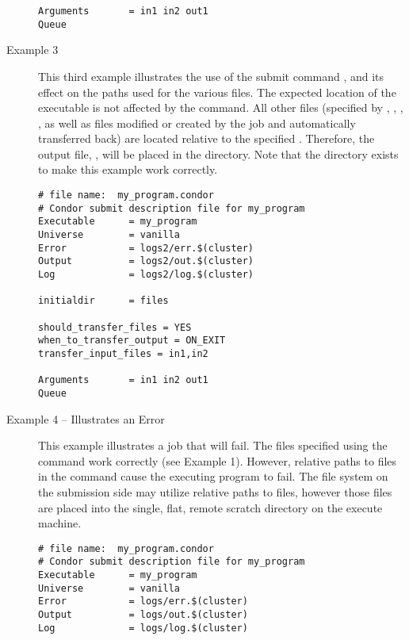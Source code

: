 \begin{description}
\begin{verbatim}
Arguments       = in1 in2 out1
Queue
\end{verbatim}
\normalsize

\item[Example 3]

This third example illustrates the use of the 
submit command , and its effect
on the paths used for the various files.
The expected location of the 
executable is not affected by the 
 command.
All other files
(specified by , , ,
,
as well as files modified or created by the job
and automatically transferred back)
are located relative to the specified .
Therefore, the output file, ,
will be placed in the \verb@files@ directory.
Note that the  directory
exists to make this example work correctly.

\footnotesize
\begin{verbatim}
# file name:  my_program.condor
# Condor submit description file for my_program
Executable      = my_program
Universe        = vanilla
Error           = logs2/err.$(cluster)
Output          = logs2/out.$(cluster)
Log             = logs2/log.$(cluster)

initialdir      = files

should_transfer_files = YES
when_to_transfer_output = ON_EXIT
transfer_input_files = in1,in2

Arguments       = in1 in2 out1
Queue
\end{verbatim}
\normalsize

\item[Example 4 -- Illustrates an Error]

This example illustrates a job that will fail.
The files specified using the
 command work
correctly (see Example 1).
However,
relative paths to files in the
 command
cause the executing program to fail.
The file system on the submission side may utilize
relative paths to files,
however those files are placed into the single,
flat, remote scratch directory on the execute machine.

\footnotesize
\begin{verbatim}
# file name:  my_program.condor
# Condor submit description file for my_program
Executable      = my_program
Universe        = vanilla
Error           = logs/err.$(cluster)
Output          = logs/out.$(cluster)
Log             = logs/log.$(cluster)


\end{verbatim}
\end{description}
